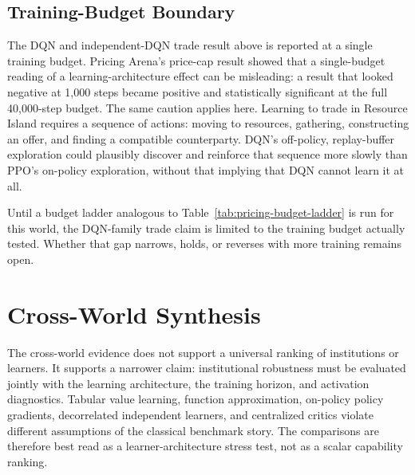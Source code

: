 \documentclass[11pt]{article}
\begin{document}
\subsection{Training-Budget Boundary}

The DQN and independent-DQN trade result above is reported at a single training
budget. Pricing Arena's price-cap result showed that a single-budget reading of
a learning-architecture effect can be misleading: a result that looked negative
at 1,000 steps became positive and statistically significant at the full
40,000-step budget. The same caution applies here. Learning to trade in Resource
Island requires a sequence of actions: moving to resources, gathering,
constructing an offer, and finding a compatible counterparty. DQN's off-policy,
replay-buffer exploration could plausibly discover and reinforce that sequence
more slowly than PPO's on-policy exploration, without that implying that DQN
cannot learn it at all.

Until a budget ladder analogous to Table~\ref{tab:pricing-budget-ladder} is run
for this world, the DQN-family trade claim is limited to the training budget
actually tested. Whether that gap narrows, holds, or reverses with more training
remains open.

\section{Cross-World Synthesis}

The cross-world evidence does not support a universal ranking of institutions
or learners. It supports a narrower claim: institutional robustness must be
evaluated jointly with the learning architecture, the training horizon, and
activation diagnostics. Tabular value
learning, function approximation, on-policy policy gradients, decorrelated
independent learners, and centralized critics violate different assumptions of
the classical benchmark story. The comparisons are therefore best read as a
learner-architecture stress test, not as a scalar capability ranking.
\end{document}
